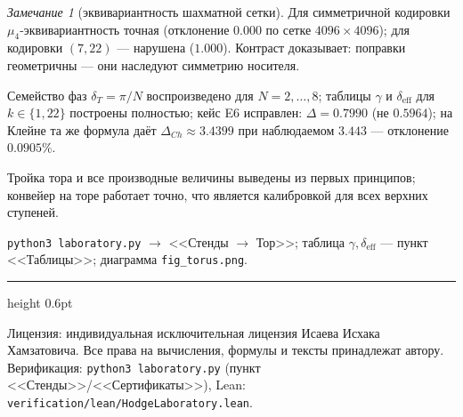 \documentclass[11pt,a4paper]{article}
\theoremstyle{plain}
\theoremstyle{definition}
\theoremstyle{remark}
\newtheorem{remark}[theorem]{Замечание}
\begin{document}
\begin{remark}[эквивариантность шахматной сетки]
Для симметричной кодировки $\mu_4$-эквивариантность точная
(отклонение $0.000$ по сетке $4096\times4096$); для кодировки
$(7,22)$ --- нарушена ($1.000$). Контраст доказывает: поправки
геометричны --- они наследуют симметрию носителя.
\end{remark}

\begin{databox}[числа]
Семейство фаз $\delta_T=\pi/N$ воспроизведено для $N=2,\dots,8$;
таблицы $\gamma$ и $\delta_{\mathrm{eff}}$ для $k\in\{1,22\}$
построены полностью; кейс E6 исправлен: $\Delta=0.7990$
(не $0.5964$); на Клейне та же формула даёт $\Delta_{Ch}\approx3.4399$
при наблюдаемом $3.443$ --- отклонение $0.0905\%$.
\end{databox}

\begin{statusbox}[итог]
Тройка тора и все производные величины выведены из первых принципов;
конвейер на торе работает точно, что является калибровкой для всех
верхних ступеней.
\end{statusbox}

\begin{verifybox}
\texttt{python3 laboratory.py} $\to$ <<Стенды $\to$ Тор>>; таблица
$\gamma,\delta_{\mathrm{eff}}$ --- пункт <<Таблицы>>;
диаграмма \texttt{fig\_torus.png}.
\end{verifybox}

\vfill
{\color{linkblue}\hrule height 0.6pt}
\vspace{0.5em}
{\small\color{gray}
Лицензия: индивидуальная исключительная лицензия Исаева Исхака Хамзатовича.
Все права на вычисления, формулы и тексты принадлежат автору.
Верификация: \texttt{python3 laboratory.py} (пункт <<Стенды>>/<<Сертификаты>>),
Lean: \texttt{verification/lean/HodgeLaboratory.lean}.
}
\end{document}
